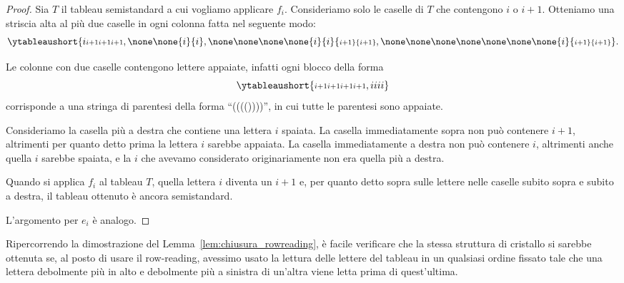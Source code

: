 \begin{proof}
    Sia $T$ il tableau semistandard a cui vogliamo applicare $f_i$.
    Consideriamo solo le caselle di $T$ che contengono $i$ o $i+1$.
    Otteniamo una striscia alta al pi\`u due caselle in ogni colonna fatta nel seguente
    modo:
    \[
        \ytableaushort{
            {i} {\scriptstyle i+1} {\scriptstyle i+1} {\scriptstyle i+1},
            \none \none {i} {i},
            \none \none \none \none {i} {i} {\scriptstyle i+1} {\scriptstyle i+1},
            \none \none \none \none \none \none \none {i} {\scriptstyle i+1} {\scriptstyle i+1}
        }.
    \]

    Le colonne con due caselle contengono lettere appaiate, infatti ogni blocco della forma
    \[
        \ytableaushort{
            {\scriptstyle i+1} {\scriptstyle i+1} {\scriptstyle i+1} {\scriptstyle i+1},
            {i} {i} {i} {i}
        }
    \]
    corrisponde a una stringa di parentesi della forma ``(((())))'', in cui tutte le parentesi
    sono appaiate.

    Consideriamo la casella pi\`u a destra che contiene una lettera $i$ spaiata.
    La casella immediatamente sopra non pu\`o contenere $i+1$, altrimenti per quanto detto
    prima la lettera $i$ sarebbe appaiata.
    La casella immediatamente a destra non pu\`o contenere $i$, altrimenti anche quella
    $i$ sarebbe spaiata, e la $i$ che avevamo considerato originariamente non era quella
    pi\`u a destra.

    Quando si applica $f_i$ al tableau $T$, quella lettera $i$ diventa un $i+1$ e,
    per quanto detto sopra sulle lettere nelle caselle subito sopra e subito a destra,
    il tableau ottenuto \`e ancora semistandard.

    L'argomento per $e_i$ \`e analogo.
\end{proof}

\begin{remark}
    Ripercorrendo la dimostrazione del Lemma~\ref{lem:chiusura_rowreading}, \`e facile 
    verificare che la stessa struttura di cristallo si sarebbe ottenuta 
    se, al posto di usare il row-reading, avessimo usato la lettura delle lettere del tableau
    in un qualsiasi ordine fissato 
    tale che
    una lettera debolmente più in alto e debolmente più a sinistra
    di un’altra viene letta prima di quest’ultima.
\end{remark}

